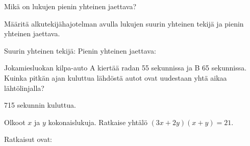 \begin{tehtavasivu}
\begin{tehtava}
    \begin{vastaus}
    \end{vastaus}
    
\end{tehtava}

\begin{tehtava}
    Mikä on lukujen pienin yhteinen jaettava?
    
    
    \begin{vastaus}
    \end{vastaus}
    
\end{tehtava}

\begin{tehtava}
    Määritä alkutekijähajotelman avulla lukujen
    suurin yhteinen tekijä ja pienin yhteinen jaettava.
    
    \begin{vastaus}
        Suurin yhteinen tekijä:
        Pienin yhteinen jaettava:
    \end{vastaus}
    
\end{tehtava}

\begin{tehtava}
    Jokamiesluokan kilpa-auto A kiertää radan 55 sekunnissa ja B 65 sekunnissa. Kuinka pitkän ajan kuluttua lähdöstä autot ovat uudestaan yhtä aikaa lähtölinjalla?
    
    \begin{vastaus}
        715 sekunnin kuluttua.
    \end{vastaus}
\end{tehtava}

\begin{tehtava}
    Olkoot $x$ ja $y$ kokonaislukuja. Ratkaise yhtälö $(3x+2y)(x+y)=21$.
    
    \begin{vastaus}
        Ratkaisut ovat:
    \end{vastaus}
    

\end{tehtava}
\end{tehtavasivu}
